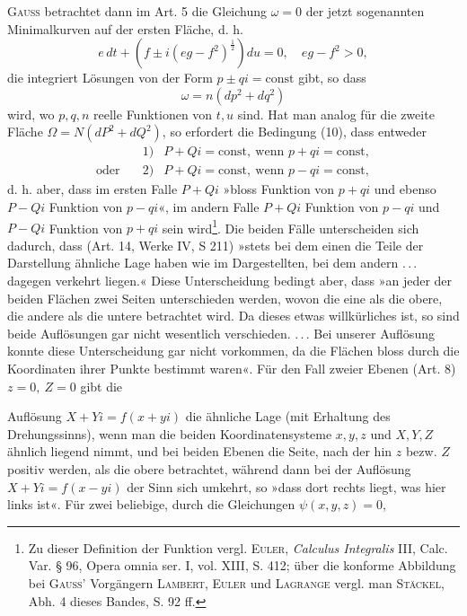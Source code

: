\textsc{Gauss} betrachtet dann im Art. 5 die Gleichung \(\omega=0\) der jetzt sogenannten
Minimalkurven auf der ersten Fläche, d. h.
\[
e\,dt+\left(f\pm i(eg-f^2)^{\frac12}\right)du=0,\quad eg-f^2>0,
\]
die integriert Lösungen von der Form \(p\pm qi=\mathrm{const}\) gibt, so dass
\[
\omega=n(dp^2+dq^2)
\]
wird, wo \(p,q,n\) reelle Funktionen von \(t,u\) sind. Hat man analog für die
zweite Fläche \(\Omega=N(dP^2+dQ^2)\), so erfordert die Bedingung (10), dass entweder
\[
\begin{array}{lrl}
&1)&P+Qi=\mathrm{const},\ \text{wenn }p+qi=\mathrm{const},\\
\text{oder}\quad&2)&P+Qi=\mathrm{const},\ \text{wenn }p-qi=\mathrm{const},
\end{array}
\]
d. h. aber, dass im ersten Falle \(P+Qi\) »bloss Funktion von \(p+qi\) und
ebenso \(P-Qi\) Funktion von \(p-qi\)«, im andern Falle \(P+Qi\) Funktion
von \(p-qi\) und \(P-Qi\) Funktion von \(p+qi\) sein wird\footnote{Zu dieser Definition der Funktion vergl. \textsc{Euler}, \textit{Calculus Integralis} III, Calc. Var. § 96, Opera omnia ser. I, vol. XIII, S. 412; über die konforme Abbildung bei \textsc{Gauss}' Vorgängern \textsc{Lambert}, \textsc{Euler} und \textsc{Lagrange} vergl. man \textsc{Stäckel}, Abh. 4 dieses Bandes, S. 92 ff.}. Die beiden Fälle
unterscheiden sich dadurch, dass (Art. 14, Werke IV, S 211) »stets bei dem
einen die Teile der Darstellung ähnliche Lage haben wie im Dargestellten,
bei dem andern \mbox{.\,.\,.} dagegen verkehrt liegen.« Diese Unterscheidung bedingt
aber, dass »an jeder der beiden Flächen zwei Seiten unterschieden werden,
wovon die eine als die obere, die andere als die untere betrachtet wird. Da
dieses etwas willkürliches ist, so sind beide Auflösungen gar nicht wesentlich
verschieden. \mbox{.\,.\,.} Bei unserer Auflösung konnte diese Unterscheidung gar nicht
vorkommen, da die Flächen bloss durch die Koordinaten ihrer Punkte bestimmt
waren«. Für den Fall zweier Ebenen (Art. 8) \(z=0,\ Z=0\) gibt die
\par\clearpage{}
\noindent Auflösung \(X+Yi=f(x+yi)\) die ähnliche Lage (mit Erhaltung des Drehungssinns),
wenn man die beiden Koordinatensysteme \(x,y,z\) und \(X,Y,Z\) ähnlich
liegend nimmt, und bei beiden Ebenen die Seite, nach der hin \(z\) bezw. \(Z\)
positiv werden, als die obere betrachtet, während dann bei der Auflösung
\(X+Yi=f(x-yi)\) der Sinn sich umkehrt, so »dass dort rechts liegt, was
hier links ist«. Für zwei beliebige, durch die Gleichungen \(\psi(x,y,z)=0\),
